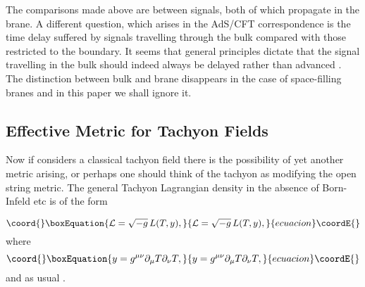 \documentclass[a4paper,12pt]{article}
\begin{document}
The comparisons made above are between signals, both of which
propagate in the brane. A different question, which arises in the
AdS/CFT correspondence is the time delay suffered by signals
travelling through the bulk compared with those restricted to the
boundary. It seems that general principles dictate that the signal
travelling in the bulk should indeed always be delayed rather than
advanced \cite{Wald, Page}. The distinction between bulk and brane
disappears in the case of space-filling branes and in this paper
we shall ignore it.

\subsection{Effective Metric for Tachyon Fields}

Now if considers a classical  tachyon field \coordHE{} there is the
possibility of yet another metric arising, or perhaps one
should think of the tachyon as modifying the open string metric.
The general Tachyon Lagrangian density \coordHE{} in the absence of
Born-Infeld etc is of the form

\begin{equation}\coord{}\boxEquation{ 
{\cal L} =\sqrt{-g} \thinspace  L(T, y),  
}{ 
{\cal L} =\sqrt{-g} \thinspace  L(T, y),  
}{ecuacion}\coordE{}\end{equation}
where
\begin{equation}\coord{}\boxEquation{ 
y= g^{\mu \nu}
\partial_\mu  T \partial_\nu T, 
}{ 
y= g^{\mu \nu}
\partial_\mu  T \partial_\nu T, 
}{ecuacion}\coordE{}\end{equation} 
and as usual \coordHE{}.
\end{document}
